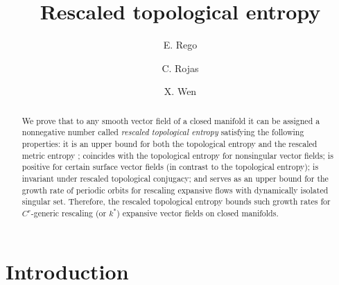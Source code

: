 \documentclass{amsart}
\numberwithin{equation}{section}
\begin{document}
\title[Rescaled topological entropy]{Rescaled topological entropy}



\author{E. Rego}
\address{AGH University of Science and Technology
Krakow, Poland.}

\author[C. Rojas]{C. Rojas}
\address{Hangzhou International Innovation Institute of Beihang University,  
Hangzhou 311115, China.}


\author[X. Wen]{X. Wen}
\address{LMIB, Institute of Artificial Intelligence and School of Mathematical Science, Beihang University, Beijing, China.}


















\begin{abstract}
We prove that to any smooth vector field of a closed manifold it can be assigned a nonnegative number called {\em rescaled topological entropy} satisfying the following properties:
it is an upper bound for both the topological entropy and the rescaled metric entropy \cite{ww};
coincides with the topological entropy for nonsingular vector fields;
is positive for certain surface vector fields (in contrast to the topological entropy);
is invariant under rescaled topological conjugacy;
and serves as an upper bound for the growth rate of periodic orbits for rescaling expansive flows with dynamically isolated singular set.
Therefore, the rescaled topological entropy bounds such growth rates for $C^r$-generic rescaling (or $k^*$) expansive vector fields on closed manifolds.
\end{abstract}




\maketitle




\section{Introduction}
\label{sec1}
\end{document}
